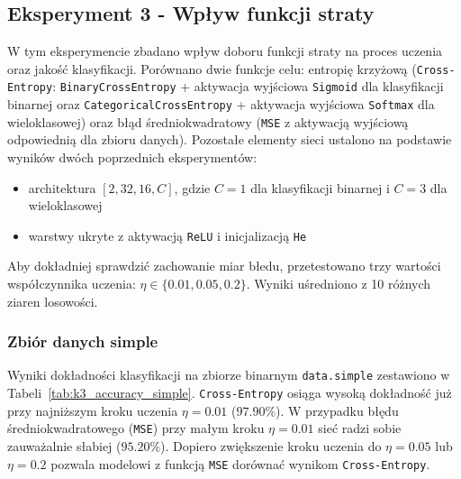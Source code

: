 \documentclass[11pt,a4paper]{article}
\begin{document}
\subsection{Eksperyment 3 - Wpływ funkcji straty}
\label{sec:K3}

W tym eksperymencie zbadano wpływ doboru funkcji straty na proces uczenia oraz jakość klasyfikacji.
Porównano dwie funkcje celu: entropię krzyżową (\texttt{Cross-Entropy}: \texttt{BinaryCrossEntropy} + aktywacja wyjściowa \texttt{Sigmoid} dla klasyfikacji binarnej oraz \texttt{CategoricalCrossEntropy} + aktywacja wyjściowa \texttt{Softmax} dla wieloklasowej)
oraz błąd średniokwadratowy (\texttt{MSE} z aktywacją wyjściową odpowiednią dla zbioru danych).
Pozostałe elementy sieci ustalono na podstawie wyników dwóch poprzednich eksperymentów:
\begin{itemize}
    \item architektura $[2, 32, 16, C]$, gdzie $C = 1$ dla klasyfikacji binarnej i $C = 3$ dla wieloklasowej
    \item warstwy ukryte z aktywacją \texttt{ReLU} i inicjalizacją \texttt{He}
\end{itemize}
Aby dokładniej sprawdzić zachowanie miar błedu, przetestowano trzy wartości współczynnika uczenia: $\eta \in \{0.01, 0.05, 0.2\}$.
Wyniki uśredniono z 10 różnych ziaren losowości.

\subsubsection{Zbiór danych simple}

Wyniki dokładności klasyfikacji na zbiorze binarnym \texttt{data.simple} zestawiono w Tabeli~\ref{tab:k3_accuracy_simple}.
\texttt{Cross-Entropy} osiąga wysoką dokładność już przy najniższym kroku uczenia $\eta = 0.01$ ($97.90\%$).
W przypadku błędu średniokwadratowego (\texttt{MSE}) przy małym kroku $\eta = 0.01$ sieć radzi sobie zauważalnie słabiej ($95.20\%$).
Dopiero zwiększenie kroku uczenia do $\eta = 0.05$ lub $\eta = 0.2$ pozwala modelowi z funkcją \texttt{MSE} dorównać wynikom \texttt{Cross-Entropy}.
\end{document}
